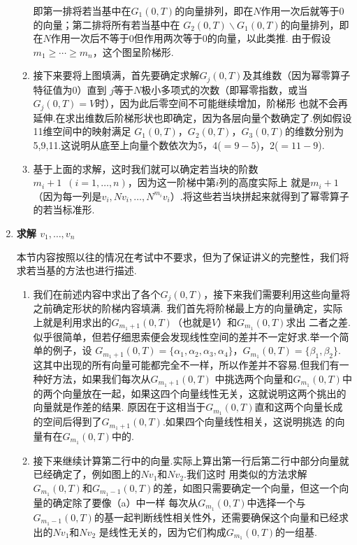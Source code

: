 \begin{enumerate}
\begin{enumerate}
        即第一排将若当基中在$G_1(0,T)$的向量排列，即在$N$作用一次后就等于0的向量；第二排将所有若当基中在
        $G_2(0,T)\backslash G_1(0,T)$的向量排列，即在$N$作用一次后不等于0但作用两次等于0的向量，以此类推.
        由于假设$m_1\geqslant\cdots\geqslant m_n$，这个图呈阶梯形.
        \item 接下来要将上图填满，首先要确定求解$G_j(0,T)$及其维数（因为幂零算子特征值为0）直到
        $j$等于$N$极小多项式的次数（即幂零指数，或当$G_j(0,T)=V$时），因为此后零空间不可能继续增加，阶梯形
        也就不会再延伸.在求出维数后阶梯形状也即确定，因为各层向量个数确定了.例如假设11维空间中的映射满足
        $G_1(0,T)$，$G_2(0,T)$，$G_3(0,T)$的维数分别为5,9,11.这说明从底至上向量个数依次为5，4($=9-5$)，2($=11-9$).
        \item 基于上面的求解，这时我们就可以确定若当块的阶数$m_i+1\enspace(i=1,\ldots,n)$，因为这一阶梯中第$i$列的高度实际上
        就是$m_i+1$（因为每一列是$v_i,Nv_i,\ldots,N^{m_i}v_i$）.将这些若当块拼起来就得到了幂零算子的若当标准形.
    \end{enumerate}
    \item \textbf{\heiti 求解 $v_1,\ldots,v_n$}

    本节内容按照以往的情况在考试中不要求，但为了保证讲义的完整性，我们将求若当基的方法也进行描述.
    \begin{enumerate}[label=(\arabic*)]
        \item 我们在前述内容中求出了各个$G_j(0,T)$，接下来我们需要利用这些向量将之前确定形状的阶梯内容填满.
        我们首先将阶梯最上方的向量确定，实际上就是利用求出的$G_{m_1+1}(0,T)$（也就是$V$）和$G_{m_1}(0,T)$求出
        二者之差.似乎很简单，但若仔细思索便会发现线性空间的差并不一定好求.举一个简单的例子，设
        $G_{m_1+1}(0,T)=\{\alpha_1,\alpha_2,\alpha_3,\alpha_4\}$，$G_{m_1}(0,T)=\{\beta_1,\beta_2\}$.
        这其中出现的所有向量可能都完全不一样，所以作差并不容易.但我们有一种好方法，如果我们每次从$G_{m_1+1}(0,T)$
        中挑选两个向量和$G_{m_1}(0,T)$中的两个向量放在一起，如果这四个向量线性无关，这就说明这两个挑出的向量就是作差的结果.
        原因在于这相当于$G_{m_1}(0,T)$直和这两个向量长成的空间后得到了$G_{m_1+1}(0,T)$.如果四个向量线性相关，这说明挑选
        的向量有在$G_{m_1}(0,T)$中的.
        \item 接下来继续计算第二行中的向量.实际上算出第一行后第二行中部分向量就已经确定了，例如图上的$Nv_1$和$Nv_2$.我们这时
        用类似的方法求解$G_{m_1}(0,T)$和$G_{m_1-1}(0,T)$的差，如图只需要确定一个向量，但这一个向量的确定除了要像（a）中一样
        每次从$G_{m_1}(0,T)$中选择一个与$G_{m_1-1}(0,T)$的基一起判断线性相关性外，还需要确保这个向量和已经求出的$Nv_1$和$Nv_2$
        是线性无关的，因为它们构成$G_{m_1}(0,T)$的一组基.


\end{enumerate}
\end{enumerate}
